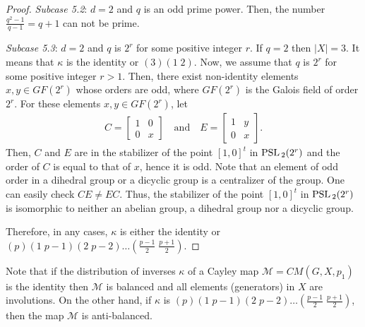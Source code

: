 \documentclass[12pt]{amsart}
\begin{document}
\begin{proof}
\emph{Subcase 5.2}: $d=2$ and $q$ is an odd prime power. Then, the
number $\frac{q^2 -1}{q-1} = q+1$ can not be prime. \smallskip

\emph{Subcase 5.3}: $d=2$ and $q$ is $2^{r}$ for some positive
integer $r$. If $q=2$ then $|X| = 3$. It means that $\kappa$ is
the identity or $(3)(1 \; 2)$. Now, we assume that $q$ is $2^{r}$
for some positive integer $r>1$. Then, there exist non-identity
elements $x, y \in GF(2^{r})$ whose orders are odd, where
$GF(2^{r})$ is the Galois field of order $2^{r}$. For these
elements $x, y \in GF(2^{r})$, let
\begin{gather*}
C = \begin{bmatrix}  1 & 0 \\ 0 & x
\end{bmatrix} \quad \mbox{and} \quad E = \begin{bmatrix} 1 & y \\ 0 &
x
\end{bmatrix}.
\end{gather*}
Then, $C$ and $E$ are in the stabilizer of the point $[1,0]^{t}$
in ${\mbox{\rm PSL\,}}_2(2^{r})$ and the order of $C$ is equal to that of $x$,
hence it is odd. Note that an element of odd order in a dihedral
group or a dicyclic group is a centralizer of the group. One can
easily check $CE \neq EC$. Thus, the stabilizer of the point
$[1,0]^{t}$ in ${\mbox{\rm PSL\,}}_2(2^{r})$ is isomorphic to neither an abelian
group,  a dihedral group nor a dicyclic group.
\medskip

Therefore, in any cases, $\kappa$ is either the identity or
$(p)(1\;p-1)(2\;p-2)\ldots(\frac{p-1}{2} \; \frac{p+1}{2})$.
\end{proof}

Note that if the distribution of inverses $\kappa$ of a Cayley map
$\mathcal{M} = CM(G, X, p_1)$ is the identity then $\mathcal{ M}$
is balanced and all elements (generators) in $X$ are involutions.
On the other hand, if $\kappa$ is
$(p)(1\;p-1)(2\;p-2)\ldots(\frac{p-1}{2} \; \frac{p+1}{2})$, then
the map $\mathcal{M}$ is anti-balanced.
\end{document}
